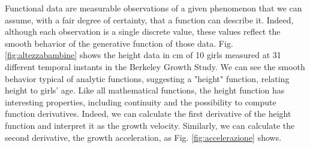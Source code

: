 Functional data are measurable observations of a given phenomenon that we can assume, with a fair degree of certainty, that a function can describe it. Indeed, although each observation is a single discrete value, these values reflect the smooth behavior of the generative function of those data. Fig. \ref{fig:altezzabambine} shows the height data in \unit{\centi\metre} of 10 girls measured at 31 different temporal instants in the Berkeley Growth Study. We can see the smooth behavior typical of analytic functions, suggesting a "height" function, relating height to girls' age. Like all mathematical functions, the height function has interesting properties, including continuity and the possibility to compute function derivatives. Indeed, we can calculate the first derivative of the height function and interpret it as the growth velocity. Similarly, we can calculate the second derivative, the growth acceleration, as Fig. \ref{fig:accelerazione} shows.
